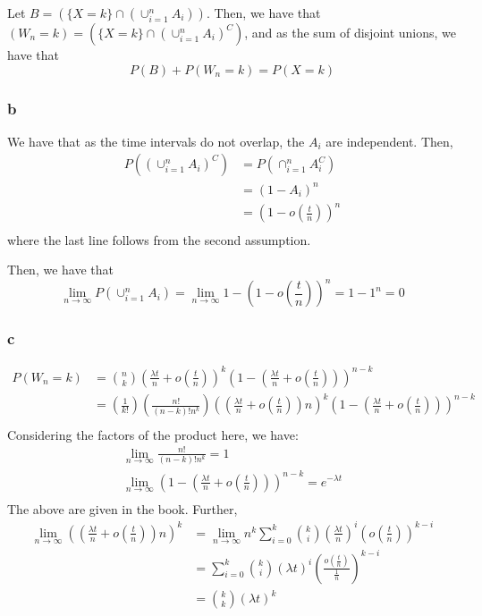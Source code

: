 \documentclass[12pt,letterpaper]{article}
\theoremstyle{definition}
\begin{document}
Let $B = (\{X = k\} \cap (\cup_{i=1}^nA_i))$. Then, we have that $(W_n = k) =
(\{X = k\} \cap (\cup_{i=1}^nA_i)^C)$, and as the sum of disjoint unions, we
have that
\[
  P(B) + P(W_n = k) = P(X = k)
\]

\subsubsection*{b}

We have that as the time intervals do not overlap, the $A_i$ are independent.
Then,
\begin{align*}
  P((\cup_{i=1}^nA_i)^C) &= P(\cap_{i=1}^nA_i^C) \\
                         &= (1 - A_i)^n \\
                         &= (1 - o(\frac{t}{n}))^n \\
\end{align*}
where the last line follows from the second assumption.

Then, we have that
\[
  \lim_{n \rightarrow \infty} P(\cup_{i=1}^nA_i) = \lim_{n \rightarrow \infty}
  1 - (1 - o(\frac{t}{n}))^n = 1 - 1^n = 0
\]

\subsubsection*{c}

\begin{align*}
  P(W_n = k) &= \binom{n}{k}(\frac{\lambda t}{n} + o(\frac{t}{n}))^k(1-(\frac{\lambda t}{n} + o(\frac{t}{n})))^{n-k} \\
             &= (\frac{1}{k!})(\frac{n!}{(n-k)!n^k})((\frac{\lambda t}{n} + o(\frac{t}{n}))n)^k(1-(\frac{\lambda t}{n} + o(\frac{t}{n})))^{n-k} \\
  \end{align*}
  Considering the factors of the product here, we have:
  \begin{gather}
    \lim_{n\rightarrow \infty} \frac{n!}{(n-k)!n^k} = 1  \\
    \lim_{n\rightarrow \infty} (1-(\frac{\lambda t}{n} + o(\frac{t}{n})))^{n-k} = e^{-\lambda t} \\
  \end{gather}
  The above are given in the book. Further,
  \begin{align*}
    \lim_{n\rightarrow \infty} ((\frac{\lambda t}{n} + o(\frac{t}{n}))n)^k &= \lim_{n\rightarrow \infty} n^k\sum_{i=0}^k\binom{k}{i}(\frac{\lambda t}{n})^i(o(\frac{t}{n}))^{k-i} \\
                                                                           &= \sum_{i=0}^k\binom{k}{i}(\lambda t)^i(\frac{o(\frac{t}{n})}{\frac{1}{n}})^{k-i} \\
                                                                           &= \binom{k}{k}(\lambda t)^k
  \end{align*}
\end{document}
